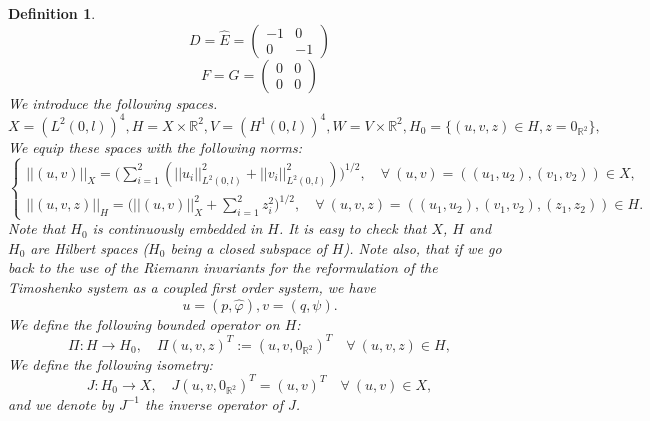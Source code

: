 \documentclass[10pt, english]{article}
\newtheorem{dfn}[thm]{Definition}
\begin{document}
{\begin{dfn}
\begin{equation}
\end{equation}
 \begin{equation}\label{C4.3}%
D=\widehat{E}=%
\begin{pmatrix}
-1 & 0  \\ 
0 & -1 
\end{pmatrix}%
\end{equation}
  \begin{equation}\label{C4.4}%
F=G=%
\begin{pmatrix}
0 & 0  \\ 
0 & 0 
\end{pmatrix}%
\end{equation}
We introduce the following spaces.
\begin{equation}\label{C4.5}%
X=(L^2(0,l))^4, H=X \times \mathbb{R}^2, V=(H^1(0,l))^4, W=V \times \mathbb{R}^2, H_0=\{(u,v,z) \in H, z=0_{\mathbb{R}^2}\},
\end{equation}
We equip these spaces with the following norms:
\begin{equation}\label{C4.6}%
\begin{cases}
||(u,v)||_X=\big(\sum_{i=1}^2 (||u_i||_{L^2(0,l)}^2 + ||v_i||_{L^2(0,l)}^2)\big)^{1/2}, \quad \forall \ (u,v)=((u_1,u_2), (v_1,v_2)) \in X, \\
||(u,v,z)||_H=\big(||(u,v)||_X^2 + \sum_{i=1}^2z_i^2\big)^{1/2},\quad \forall \ (u,v,z)=((u_1,u_2), (v_1,v_2), (z_1,z_2)) \in H.
\end{cases}
\end{equation}
Note that $H_0$ is continuously embedded in $H$. It is easy to check that $X$, $H$ and $H_0$ are Hilbert spaces ($H_0$ being a closed subspace of $H$). 
Note also, that if we go back to the use of the Riemann invariants for the reformulation of the Timoshenko system as a coupled first order system, we have 
$$
u=(p,\widehat{\varphi}), v=(q, \psi).
$$
We define the following bounded operator on $H$:
\begin{equation}\label{C4.7}%
\Pi: H \longrightarrow H_0, \quad \Pi(u,v,z)^T:=(u,v,0_{\mathbb{R}^2})^T \quad \forall \ (u,v,z) \in H,
\end{equation}
We define the following isometry:
\begin{equation}\label{C4.8}%
J: H_0 \longrightarrow X, \quad J(u,v,0_{\mathbb{R}^2})^T=(u,v)^T \quad \forall \ (u,v) \in X,
\end{equation}
and we denote by $J^{-1}$ the inverse operator of $J$. 

\end{dfn}}
\end{document}
